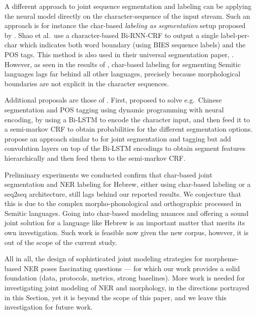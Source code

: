 \documentclass[11pt,a4paper]{article}
\begin{document}
A different approach to joint sequence segmentation and labeling can be  applying the neural model directly on the character-sequence of the input stream. 
Such an approach is for instance the char-based {\em labeling as segmentation} setup  proposed by \citet{shao-etal-2017-character}. Shao et al.\  use a character-based Bi-RNN-CRF to output a single label-per-char which indicates  both  word boundary (using BIES sequence labels) and the POS tags.
This method is also used in their universal segmentation paper, \cite{shao-etal-2018-universal}.
However, as seen in the results of \citet{shao-etal-2018-universal}, char-based labeling for segmenting Semitic languages lags far behind all other languages, precisely because morphological boundaries are not explicit in the character sequences. 

Additional proposals are those of \citet{kong2015segmental,kemos-etal-2019-neural}.
First, \citet{kong2015segmental} proposed to solve
 e.g.\ Chinese segmentation and POS tagging using
dynamic programming with neural encoding, by using a Bi-LSTM to encode the character input, and then feed it to a semi-markov CRF to obtain probabilities for the different segmentation options. 
\citet{kemos-etal-2019-neural} propose an approach similar to \citet{kong2015segmental} for joint segmentation and tagging but add convolution layers on top of the Bi-LSTM encodings to obtain segment features hierarchically and then feed them to the semi-markov CRF. 


Preliminary experiments we conducted confirm that  char-based  joint segmentation and NER labeling for Hebrew, either using char-based labeling or a seq2seq architecture, still lags  behind our reported results. We conjecture that this is due to the complex morpho-phonological and orthographic processed in Semitic languages. Going into char-based modeling nuances and offering a sound joint solution for a language like Hebrew is an important matter that merits its own investigation. Such work is feasible now given the new corpus, however, it is out of the scope of the current study.


All in all, the design of  sophisticated joint modeling strategies for morpheme-based NER poses fascinating questions --- for which our work provides a solid  foundation  (data, protocols, metrics, strong baselines).
More work is needed for investigating joint modeling of  NER and morphology, in the directions portrayed in this Section, yet it is beyond the scope of this  paper, and we leave this investigation for future work. 
\end{document}
